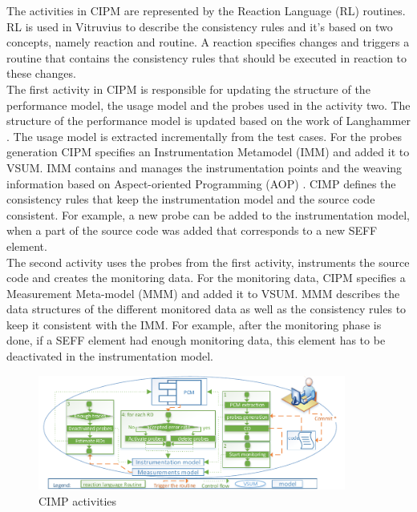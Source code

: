 The activities in CIPM are represented by the Reaction Language (RL) routines. RL is used in Vitruvius to describe the consistency rules and it's based on two concepts, namely reaction and routine. A reaction specifies changes and triggers a routine that contains the consistency rules that should be executed in reaction to these changes. \\ 

The first activity in CIPM is responsible for updating the structure of the performance model, the usage model and the probes used in the activity two. The structure of the performance model is updated based on the work of Langhammer \cite{langhammer2015co}. The usage model is extracted incrementally from the test cases. For the probes generation CIPM specifies an Instrumentation Metamodel (IMM) and added it to VSUM. IMM contains and manages the instrumentation points and the weaving information based on Aspect-oriented Programming (AOP) \cite{kiczales1997j}. CIMP defines the consistency rules that keep the instrumentation model and the source code consistent. For example, a new probe can be added to the instrumentation model, when a part of the source code was added that corresponds to a new SEFF element. \\

The second activity uses the probes from the first activity, instruments the source code and creates the monitoring data. For the monitoring data, CIPM specifies a Measurement Meta-model (MMM) and added it to VSUM. MMM describes the data structures of the different monitored data as well as the consistency rules to keep it consistent with the IMM. For example, after the monitoring phase is done, if a SEFF element had enough monitoring data, this element has to be deactivated in the instrumentation model. 

\begin{figure}[h]
\centering
\includegraphics[width=0.9\textwidth]{figures/cipm}
\caption{CIMP activities}
\label{fig:CIMP activities}
\end{figure} 

